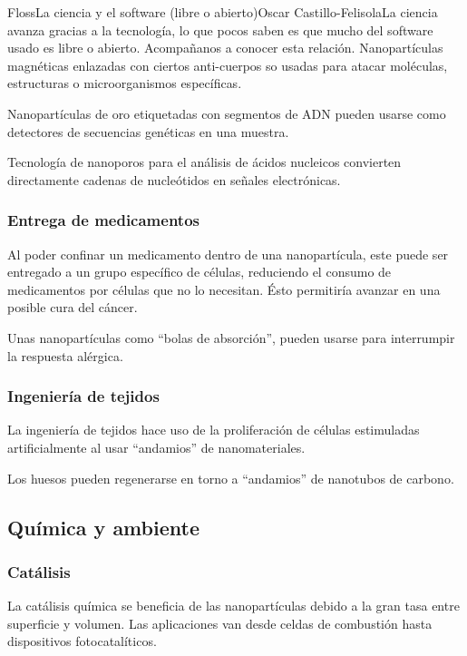 \begin{article}[2]{Floss}{La ciencia y el software (libre o abierto)}{Oscar Castillo-Felisola}{La ciencia avanza gracias a la tecnolog\'ia, lo que pocos saben es que mucho del software usado es libre o abierto. Acompa\~nanos a conocer esta relaci\'on.}
Nanopart\'iculas magn\'eticas enlazadas con ciertos anti-cuerpos so usadas para atacar mol\'eculas, estructuras o microorganismos  espec\'ificas.

Nanopart\'iculas de oro etiquetadas con segmentos de ADN pueden usarse como detectores de secuencias gen\'eticas en una muestra.

Tecnolog\'ia de nanoporos para el an\'alisis de \'acidos nucleicos convierten directamente cadenas de nucle\'otidos en se\~nales electr\'onicas.

\subsubsection*{Entrega de medicamentos}

Al poder confinar un medicamento dentro de una nanopart\'icula, este puede ser entregado a un grupo espec\'ifico de c\'elulas, reduciendo el consumo de medicamentos por c\'elulas que no lo necesitan. \'Esto permitir\'ia avanzar en una posible %
cura del c\'ancer.

Unas nanopart\'iculas como ``bolas de absorci\'on'', pueden usarse para interrumpir la respuesta al\'ergica. 


\subsubsection*{Ingenier\'ia de tejidos}

La ingenier\'ia de tejidos hace uso de la proliferaci\'on de c\'elulas estimuladas artificialmente al usar ``andamios'' de nanomateriales.

Los huesos pueden regenerarse en torno a ``andamios'' de nanotubos de carbono.

\subsection{Qu\'imica y ambiente}

\subsubsection*{Cat\'alisis}

La cat\'alisis qu\'imica se beneficia de las nanopart\'iculas debido a la gran tasa entre superficie y volumen. Las aplicaciones van desde celdas de combusti\'on hasta dispositivos fotocatal\'iticos.


\end{article}
